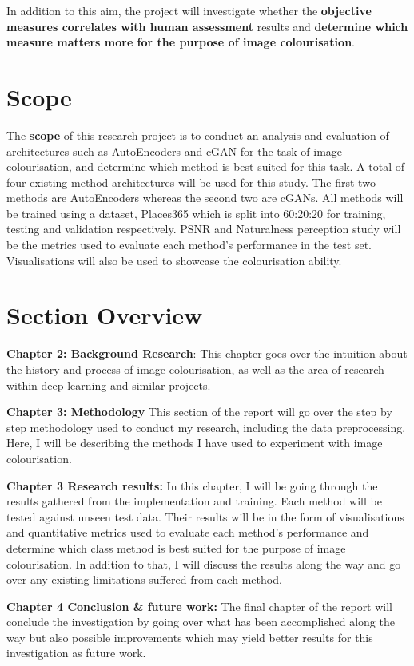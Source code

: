 In addition to this aim, the project will investigate whether the \textbf{objective measures correlates with human assessment} results and \textbf{determine which measure matters more for the purpose of image colourisation}.

\section{Scope}
The \textbf{scope} of this research project is to conduct an analysis and evaluation of architectures such as AutoEncoders and cGAN for the task of image colourisation, and determine which method is best suited for this task. A total of four existing method architectures will be used for this study. The first two methods are AutoEncoders whereas the second two are cGANs. All methods will be trained using a dataset, Places365 which is split into 60:20:20 for training, testing and validation respectively. PSNR and Naturalness perception study will be the metrics used to evaluate each method's performance in the test set. Visualisations will also be used to showcase the colourisation ability.  


\section{Section Overview}
\textbf{Chapter 2: Background Research}: This chapter goes over the intuition about the history and process of image colourisation, as well as the area of research within deep learning and similar projects.

\textbf{Chapter 3: Methodology} This section of the report will go over the step by step methodology used to conduct my research, including the data preprocessing. Here, I will be describing the methods I have used to experiment with image colourisation.

\textbf{Chapter 3 Research results:} In this chapter, I will be going through the results gathered from the implementation and training. Each method will be tested against unseen test data. Their results will be in the form of visualisations and quantitative metrics used to evaluate each method's performance and determine which class method is best suited for the purpose of image colourisation. In addition to that, I will discuss the results along the way and go over any existing limitations suffered from each method.

\textbf{Chapter 4 Conclusion & future work:} The final chapter of the report will conclude the investigation by going over what has been accomplished along the way but also possible improvements which may yield better results for this investigation as future work.




